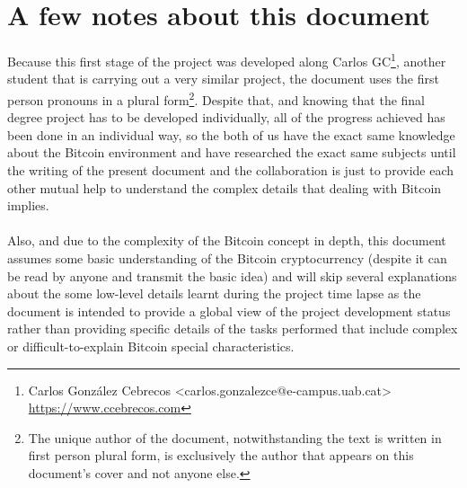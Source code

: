 \documentclass[a4paper,12pt,openany]{report}
\begin{document}
\tableofcontents
\listoffigures
\clearpage

\chapter*{A few notes about this document}
Because this first stage of the project was developed along Carlos GC\footnote{Carlos González Cebrecos <carlos.gonzalezce@e-campus.uab.cat> \url{https://www.ccebrecos.com}}, another student that is carrying out a very similar project, the document uses the first person pronouns in a plural form\footnote{The unique author of the document, notwithstanding the text is written in first person plural form, is exclusively the author that appears on this document's cover and not anyone else.}. Despite that, and knowing that the final degree project has to be developed individually, all of the progress achieved has been done in an individual way, so the both of us have the exact same knowledge about the Bitcoin environment and have researched the exact same subjects until the writing of the present document and the collaboration is just to provide each other mutual help to understand the complex details that dealing with Bitcoin implies.\\\\

Also, and due to the complexity of the Bitcoin concept in depth, this document assumes some basic understanding of the Bitcoin cryptocurrency (despite it can be read by anyone and transmit the basic idea) and will skip several explanations about the some low-level details learnt during the project time lapse as the document is intended to provide a global view of the project development status rather than providing specific details of the tasks performed that include complex or difficult-to-explain Bitcoin special characteristics.

\pagestyle{fancy}

\cleardoublepage
\setcounter{chapter}{1}
\setcounter{section}{0}

\setcounter{chapter}{2}
\setcounter{section}{0}

\setcounter{chapter}{3}
\setcounter{section}{0}

\setcounter{chapter}{4}
\setcounter{section}{0}

\setcounter{chapter}{5}
\setcounter{section}{0}

\setcounter{chapter}{6}
\setcounter{section}{0}

\setcounter{chapter}{7}
\setcounter{section}{0}

\appendix
\end{document}
